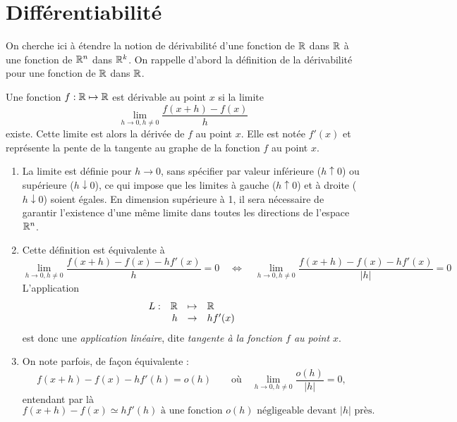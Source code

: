 \section{Différentiabilité} \label{sec:Multivar-Diff}


On cherche ici à étendre la notion de dérivabilité d'une fonction de $\mathbb{R}$ dans $\mathbb{R}$ à une fonction de $\mathbb{R}^n$ dans $\mathbb{R}^k$. On rappelle d'abord la définition de la dérivabilité pour une fonction de $\mathbb{R}$ dans $\mathbb{R}$.

\begin{definition}[Dérivabilité] \label{def:derivabilite}
  Une fonction $f: \mathbb{R} \mapsto \mathbb{R}$ est dérivable au point $x$ si la limite
  $$
  \lim_{h \to 0, h \neq 0} \frac{f(x+h) - f(x)}{h}
  $$
  existe. Cette limite est alors la dérivée de $f$ au point $x$. Elle est notée $f'(x)$ et représente la pente de la tangente au graphe de la fonction $f$ au point $x$.
\end{definition}

\remarks
\begin{enumerate}
  \item La limite est définie pour $h \to 0$, sans spécifier par valeur inférieure ($h \uparrow 0$) ou supérieure ($h \downarrow 0$), ce qui impose que les limites à gauche ($h \uparrow 0$) et à droite ($h \downarrow 0$) soient égales. En dimension supérieure à 1, il sera nécessaire de garantir l'existence d'une même limite dans toutes les directions de l'espace $\mathbb{R}^n$.
  \item Cette définition est équivalente à
  $$
  \lim_{h\to 0, h \neq 0} \frac{f(x+h) - f(x) - hf'(x)}{h} = 0
  \quad \Leftrightarrow \quad 
  \lim_{h\to 0, h \neq 0} \frac{f(x+h) - f(x) - hf'(x)}{|h|} = 0
  $$
  L'application 
  $$
  \begin{array}{rrcl}
    L :  & \mathbb{R} & \mapsto & \mathbb{R} \\
    & h & \to &  hf'(x)
  \end{array}
  $$
  est donc une {\sl application linéaire}, dite {\sl tangente à la fonction $f$ au point $x$}.
  \item On note parfois, de façon équivalente :
  $$
  f(x+h) - f(x) - h f'(h) = o(h)
  \qquad \text{où} \quad
  \lim_{h\to 0, h \neq 0} \frac{o(h)}{|h|} = 0,
  $$
  entendant par là 
  $$
  \text{$f(x+h) - f(x) \simeq h f'(h)$ à une fonction $o(h)$ négligeable devant $|h|$ près.}
  $$
\end{enumerate}

